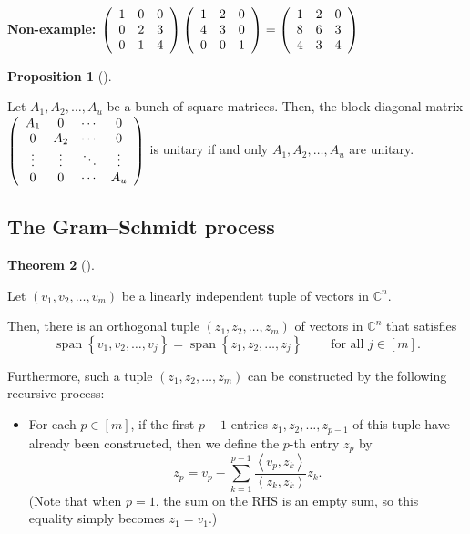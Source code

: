 \documentclass[numbers=enddot,12pt,final,onecolumn,notitlepage]{scrartcl}%
\numberwithin{exer}{subsection}
\theoremstyle{definition}
\newtheorem{theo}{Theorem}[subsection]
\newenvironment{theorem}[1][]
{\begin{theo}[#1]\begin{leftbar}}
{\end{leftbar}\end{theo}}
\newtheorem{prop}[theo]{Proposition}
\newenvironment{proposition}[1][]
{\begin{prop}[#1]\begin{leftbar}}
{\end{leftbar}\end{prop}}
\let\sumnonlimits\sum
\renewcommand{\sum}{\sumnonlimits\limits}
\begin{document}
\textbf{Non-example:} $\left(
\begin{array}
[c]{ccc}%
1 & 0 & 0\\
0 & 2 & 3\\
0 & 1 & 4
\end{array}
\right)  \left(
\begin{array}
[c]{ccc}%
1 & 2 & 0\\
4 & 3 & 0\\
0 & 0 & 1
\end{array}
\right)  =\allowbreak\left(
\begin{array}
[c]{ccc}%
1 & 2 & 0\\
8 & 6 & 3\\
4 & 3 & 4
\end{array}
\right)  $

\begin{proposition}
Let $A_{1},A_{2},\ldots,A_{u}$ be a bunch of square matrices. Then, the
block-diagonal matrix $\left(
\begin{array}
[c]{cccc}%
A_{1} & 0 & \cdots & 0\\
0 & A_{2} & \cdots & 0\\
\vdots & \vdots & \ddots & \vdots\\
0 & 0 & \cdots & A_{u}%
\end{array}
\right)  $ is unitary if and only $A_{1},A_{2},\ldots,A_{u}$ are unitary.
\end{proposition}

\subsection{The Gram--Schmidt process}

\begin{theorem}
[Gram--Schmidt process]Let $\left(  v_{1},v_{2},\ldots,v_{m}\right)  $ be a
linearly independent tuple of vectors in $\mathbb{C}^{n}$.

Then, there is an orthogonal tuple $\left(  z_{1},z_{2},\ldots,z_{m}\right)  $
of vectors in $\mathbb{C}^{n}$ that satisfies%
\[
\operatorname*{span}\left\{  v_{1},v_{2},\ldots,v_{j}\right\}
=\operatorname*{span}\left\{  z_{1},z_{2},\ldots,z_{j}\right\}
\ \ \ \ \ \ \ \ \ \ \text{for all }j\in\left[  m\right]  .
\]


Furthermore, such a tuple $\left(  z_{1},z_{2},\ldots,z_{m}\right)  $ can be
constructed by the following recursive process:

\begin{itemize}
\item For each $p\in\left[  m\right]  $, if the first $p-1$ entries
$z_{1},z_{2},\ldots,z_{p-1}$ of this tuple have already been constructed, then
we define the $p$-th entry $z_{p}$ by%
\[
z_{p}=v_{p}-\sum_{k=1}^{p-1}\dfrac{\left\langle v_{p},z_{k}\right\rangle
}{\left\langle z_{k},z_{k}\right\rangle }z_{k}.
\]
(Note that when $p=1$, the sum on the RHS is an empty sum, so this equality
simply becomes $z_{1}=v_{1}$.)
\end{itemize}
\end{theorem}
\end{document}
